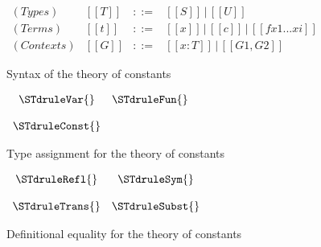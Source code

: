 \begin{figure}
  \begin{center}
    \begin{math}
      \begin{array}{rlllll}
        (Types)    & [[T]] & ::= & [[S]]\,|\,[[U]]\\
        (Terms)    & [[t]] & ::= & [[x]]\,|\,[[c]]\,|\,[[f x1 ... xi]]\\
        (Contexts) & [[G]] & ::= & [[x:T]]\,|\,[[G1,G2]]
      \end{array}
    \end{math}
  \end{center}
  \caption{Syntax of the theory of constants}
  \label{fig:syntax_theory_constants}
\end{figure}

\begin{figure}
  \begin{center}
    \begin{math}
      \begin{array}{cc}
        \STdruleVar{} & \STdruleFun{}\\
        & \\
        \STdruleConst{}
      \end{array}
    \end{math}
  \end{center}
  \caption{Type assignment for the theory of constants}
  \label{fig:typing_theory_constants}
\end{figure}

\begin{figure}
  \begin{center}
    \begin{math}
      \begin{array}{cc}
        \STdruleRefl{} & \STdruleSym{}\\
        & \\
        \STdruleTrans{} & \STdruleSubst{}\\
      \end{array}
    \end{math}
  \end{center}
  \caption{Definitional equality for the theory of constants}
  \label{fig:eq_theory_constants}
\end{figure}

